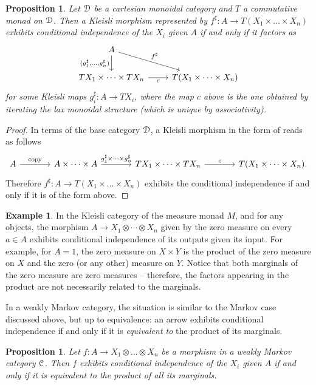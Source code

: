 \documentclass[a4paper,UKenglish,numberwithinsect,cleveref, autoref, thm-restate]{lipics-v2021}
\theoremstyle{plain} %
\newtheorem{myproposition}[mytheorem]{Proposition}
\theoremstyle{definition} %
\newtheorem{myexample}[mytheorem]{Example}
\begin{document}
\begin{myproposition}\label{indepkleisli}
 Let $\mathcal{D}$ be a cartesian monoidal category and $T$ a commutative monad on $\mathcal{D}$.
 Then a Kleisli morphism represented by $f^\sharp:A\to T(X_1\times\dots\times X_n)$ exhibits conditional independence of the $X_i$ given $A$ if and only if it factors as
 \[
 \begin{tikzcd}
  A \ar{d}[swap]{(g_1^\sharp,\dots,g_n^\sharp)} \ar{dr}{f^\sharp} \\
  TX_1\times\dots\times TX_n \ar{r}[swap]{c} & T(X_1\times\dots\times X_n) 
 \end{tikzcd}
 \]
 for some Kleisli maps $g_i^\sharp:A\to TX_i$,
 where the map $c$ above is the one obtained by iterating the lax monoidal structure (which is unique by associativity). 
\end{myproposition}
\begin{proof}
 In terms of the base category $\mathcal{D}$, a Kleisli morphism in the form of  reads as follows
 \[
  \begin{tikzcd}[sep=large]
   A \ar{r}{\mathrm{copy}} & A\times\dots\times A \ar{r}{g_1^\sharp\times\dots\times g_n^\sharp} & TX_1\times\dots\times TX_n \ar{r}{c} & T(X_1\times\dots\times X_n) .
  \end{tikzcd}
 \]
 Therefore $f^\sharp:A\to T(X_1\times\dots\times X_n)$ exhibits the conditional independence if and only if it is of the form above.
\end{proof}

\begin{myexample}\label{zeromeasure}
	In the Kleisli category of the measure monad $M$, and for any objects, the morphism $A \to X_1 \otimes \cdots \otimes X_n$ given by the zero measure on every $a \in A$ exhibits conditional independence of its outputs given its input. For example, for $A=1$, the zero measure on $X\times Y$ is the product of the zero measure on $X$ and the zero (or any other) measure on $Y$.
 Notice that both marginals of the zero measure are zero measures -- therefore, the factors appearing in the product are not necessarily related to the marginals.
\end{myexample}
%
In a weakly Markov category, the situation is similar to the Markov case discussed above,
but up to equivalence: an arrow exhibits conditional independence if and only if it is \emph{equivalent to} the product of its marginals.

\begin{myproposition}\label{eqcondind}
 Let $f:A\to X_1\otimes\dots\otimes X_n$ be a morphism in a weakly Markov category $\mathcal{C}$. Then $f$ exhibits conditional independence of the $X_i$ given $A$ if and only if it is equivalent to the product of all its marginals.
\end{myproposition}
\end{document}
